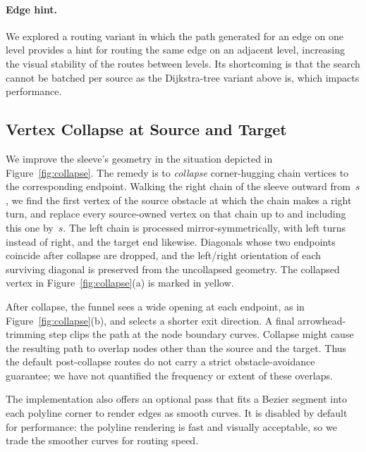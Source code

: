 \documentclass[review]{vgtc}          %
\begin{document}
\paragraph{Edge hint.}
We explored a routing variant in which the path generated for an edge
on one level provides a hint for routing the same edge on an adjacent
level, increasing the visual stability of the routes between
levels. Its shortcoming is that the search cannot be batched per
source as the Dijkstra-tree variant above is, which impacts
performance.

\subsection{Vertex Collapse at Source and Target}
\label{sec:collapse}

We improve the sleeve's geometry in the situation depicted in
Figure~\ref{fig:collapse}. The remedy is to \emph{collapse}
corner-hugging chain vertices to the corresponding endpoint. Walking
the right chain of the sleeve outward from~$s$, we
find the first vertex of the source obstacle at which the chain makes
a right turn, and replace every source-owned vertex on that chain
up to and including this one by~$s$. The left chain is processed
mirror-symmetrically, with left turns instead of right, and the
target end likewise. Diagonals whose two endpoints coincide after
collapse are dropped, and the left/right orientation of each surviving
diagonal is preserved from the uncollapsed geometry. The collapsed
vertex in Figure~\ref{fig:collapse}(a) is marked in yellow.

After collapse, the funnel sees a wide opening at each endpoint, as in
Figure~\ref{fig:collapse}(b), and selects a shorter exit
direction. A final arrowhead-trimming step clips the path at the node
boundary curves. Collapse might cause the resulting path to overlap
nodes other than the source and the target. Thus the default
post-collapse routes do not carry a strict obstacle-avoidance
guarantee; we have not quantified the frequency or extent of these
overlaps.

The implementation also offers an optional pass that fits a Bezier segment into each polyline corner to render edges as smooth curves. It is disabled by default for performance: the polyline rendering is fast and visually acceptable, so we trade the smoother curves for routing speed.
\end{document}
